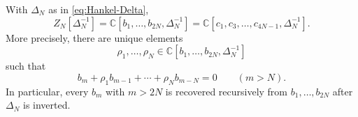 \documentclass[10pt,a4paper]{amsart}
\newcommand{\C}{\mathbb C}
\begin{document}
\begin{theorem}
\label{thm:generic-finite-generation}
With \(\Delta_N\) as in \eqref{eq:Hankel-Delta},
\begin{equation}
 \boxed{
 Z_N[\Delta_N^{-1}]
 =\C[b_1,\ldots,b_{2N},\Delta_N^{-1}]
 =\C[c_1,c_3,\ldots,c_{4N-1},\Delta_N^{-1}].}
 \label{eq:generic-finite-generation}
\end{equation}
More precisely, there are unique elements
\[
 \rho_1,\ldots,\rho_N
 \in\C[b_1,\ldots,b_{2N},\Delta_N^{-1}]
\]
such that
\begin{equation}
 b_m+\rho_1b_{m-1}+\cdots+\rho_Nb_{m-N}=0
 \qquad(m>N).
 \label{eq:central-reconstruction-recurrence}
\end{equation}
In particular, every \(b_m\) with \(m>2N\) is recovered recursively
from \(b_1,\ldots,b_{2N}\) after \(\Delta_N\) is inverted.
\end{theorem}
\end{document}
